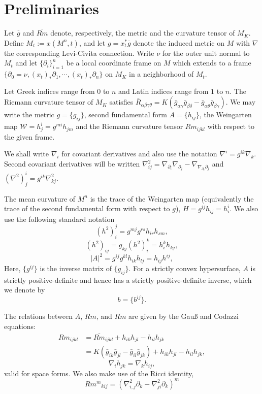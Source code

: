 \documentclass[12pt]{amsart}
\begin{document}
\section{Preliminaries}

Let $\overline{g}$ and $\overline{Rm}$ denote, respectively, the metric and the curvature tensor of $M_K$. Define \(M_t := x(M^n,t)\), and let \(g = x_t^{\ast} \overline{g}\) denote the induced metric on \(M\) with $\nabla$ the corresponding Levi-Civita connection. Write $\nu$ for the outer unit normal to $M_t$ and let \(\{\partial_i\}_{i=1}^n\) be a local coordinate frame on \(M\) which extends to a frame \(\{\partial_0 = \nu, (x_t)_{\ast} \partial_1, \cdots, (x_t)_{\ast} \partial_n\}\) on \(M_K\) in a neighborhood of \(M_t\).

Let Greek indices range from \(0\) to \(n\) and Latin indices range from \(1\) to \(n\). The Riemann curvature tensor of \(M_K\) satisfies \(\bar{R}_{\alpha\beta\gamma\theta} = K(\bar{g}_{\alpha\gamma}\bar{g}_{\beta\delta} - \bar{g}_{\alpha\theta}\bar{g}_{\beta\gamma})\). We may write the metric $g = \{g_{ij}\}$, second fundamental form $A = \{h_{ij}\}$, the Weingarten map $\mathcal{W} = h^i_j = g^{mi} h_{jm}$ and the Riemann curvature tensor $Rm_{ijkl}$ with respect to the given frame.

We shall write \(\nabla_i\) for covariant derivatives and also use the notation \(\nabla^i = g^{ik} \nabla_k\). Second covariant derivatives will be written \(\nabla^2_{ij} = \nabla_{\partial_i} \nabla_{\partial_j} - \nabla_{\nabla_{\partial_i} \partial_j}\) and \((\nabla^2)^i_j = g^{ik} \nabla^2_{kj}\).

The mean curvature of $M^n$ is the trace of the Weingarten map (equivalently the trace of the second fundamental form with respect to $g$), $H = g^{ij}h_{ij} = h^i_i$. We also use the following standard notation
\[
(h^2)_i^j = g^{mj}g^{rs}h_{ir}h_{sm},
\]
\[
(h^2)_{ij} = g_{kj} (h^2)_i^k = h^k_i h_{kj},
\]
\[
|A|^2 = g^{ij}g^{kl}h_{ik}h_{lj} = h_{ij}h^{ij},
\]
Here, $\{g^{ij}\}$ is the inverse matrix of $\{g_{ij}\}.$ For a strictly convex hypersurface, \(A\) is strictly positive-definite and hence has a strictly positive-definite inverse, which we denote by
\[
b = \{b^{ij}\}.
\]

The relations between $A$, $Rm$, and $\overline{Rm}$ are given by the Gau{\ss} and Codazzi equations:
\[
\begin{split}
Rm_{ijkl} &= \overline{Rm}_{ijkl} + h_{ik}h_{jl} - h_{il}h_{jk} \\
&= K(\bar{g}_{ik}\bar{g}_{jl} - \bar{g}_{il}\bar{g}_{jk}) + h_{ik}h_{jl} - h_{il}h_{jk},
\end{split}
\]
\[
\nabla_i h_{jk} = \nabla_k h_{ij},
\]
valid for space forms. We also make use of the Ricci identity,
\[
{Rm^m}_{kij}  = \left(\nabla^2_{i, j} \partial_k - \nabla^2_{ji} \partial_k\right)^m
\]
\end{document}
